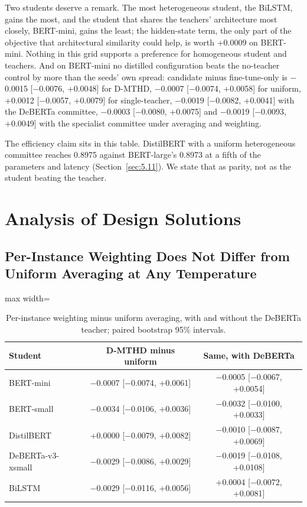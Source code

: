 Two students deserve a remark. The most heterogeneous student, the BiLSTM, gains the most, and the
student that shares the teachers' architecture most closely, BERT-mini, gains the least; the
hidden-state term, the only part of the objective that architectural similarity could help, is worth
+0.0009 on BERT-mini. Nothing in this grid supports a preference for homogeneous student and
teachers. And on BERT-mini no distilled configuration beats the no-teacher control by more than the
seeds' own spread: candidate minus fine-tune-only is $-$0.0015 [$-$0.0076, +0.0048] for D-MTHD,
$-$0.0007 [$-$0.0074, +0.0058] for uniform, +0.0012 [$-$0.0057, +0.0079] for single-teacher,
$-$0.0019 [$-$0.0082, +0.0041] with the DeBERTa committee, $-$0.0003 [$-$0.0080, +0.0075] and
$-$0.0019 [$-$0.0093, +0.0049] with the specialist committee under averaging and weighting.

The efficiency claim sits in this table. DistilBERT with a uniform heterogeneous committee reaches
0.8975 against BERT-large's 0.8973 at a fifth of the parameters and latency
(Section~\ref{sec:5.11}). We state that as parity, not as the student beating the teacher.
\section{Analysis of Design Solutions}
\label{sec:5.analysis}
\subsection{Per-Instance Weighting Does Not Differ from Uniform Averaging at Any Temperature}
\label{sec:5.3}
\begin{table}[htbp]
\centering
\small
\caption[Per-instance weighting minus uniform averaging]{Per-instance weighting minus uniform averaging, with and without the DeBERTa teacher; paired bootstrap 95\% intervals.}
\label{tab:dmthd-uniform}
\begin{adjustbox}{max width=\textwidth}
\begin{tabular}{lcc}
\toprule
Student & D-MTHD minus uniform & Same, with DeBERTa \\
\midrule
BERT-mini & $-$0.0007 [$-$0.0074, +0.0061] & $-$0.0005 [$-$0.0067, +0.0054] \\
BERT-small & $-$0.0034 [$-$0.0106, +0.0036] & $-$0.0032 [$-$0.0100, +0.0033] \\
DistilBERT & +0.0000 [$-$0.0079, +0.0082] & $-$0.0010 [$-$0.0087, +0.0069] \\
DeBERTa-v3-xsmall & $-$0.0029 [$-$0.0086, +0.0029] & $-$0.0019 [$-$0.0108, +0.0108] \\
BiLSTM & $-$0.0029 [$-$0.0116, +0.0056] & +0.0004 [$-$0.0072, +0.0081] \\
\bottomrule
\end{tabular}
\end{adjustbox}
\end{table}

